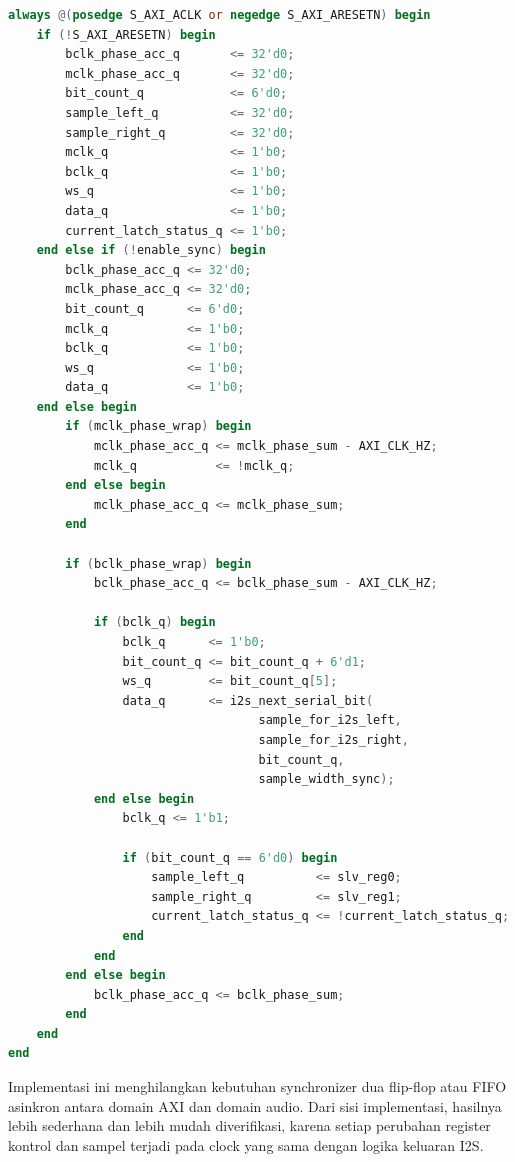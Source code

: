 \begin{lstlisting}[language=Verilog,caption={Core serializer berjalan pada satu domain clock yang sama.},label={lst:ch4-single-clock}]
always @(posedge S_AXI_ACLK or negedge S_AXI_ARESETN) begin
    if (!S_AXI_ARESETN) begin
        bclk_phase_acc_q       <= 32'd0;
        mclk_phase_acc_q       <= 32'd0;
        bit_count_q            <= 6'd0;
        sample_left_q          <= 32'd0;
        sample_right_q         <= 32'd0;
        mclk_q                 <= 1'b0;
        bclk_q                 <= 1'b0;
        ws_q                   <= 1'b0;
        data_q                 <= 1'b0;
        current_latch_status_q <= 1'b0;
    end else if (!enable_sync) begin
        bclk_phase_acc_q <= 32'd0;
        mclk_phase_acc_q <= 32'd0;
        bit_count_q      <= 6'd0;
        mclk_q           <= 1'b0;
        bclk_q           <= 1'b0;
        ws_q             <= 1'b0;
        data_q           <= 1'b0;
    end else begin
        if (mclk_phase_wrap) begin
            mclk_phase_acc_q <= mclk_phase_sum - AXI_CLK_HZ;
            mclk_q           <= !mclk_q;
        end else begin
            mclk_phase_acc_q <= mclk_phase_sum;
        end

        if (bclk_phase_wrap) begin
            bclk_phase_acc_q <= bclk_phase_sum - AXI_CLK_HZ;

            if (bclk_q) begin
                bclk_q      <= 1'b0;
                bit_count_q <= bit_count_q + 6'd1;
                ws_q        <= bit_count_q[5];
                data_q      <= i2s_next_serial_bit(
                                   sample_for_i2s_left,
                                   sample_for_i2s_right,
                                   bit_count_q,
                                   sample_width_sync);
            end else begin
                bclk_q <= 1'b1;

                if (bit_count_q == 6'd0) begin
                    sample_left_q          <= slv_reg0;
                    sample_right_q         <= slv_reg1;
                    current_latch_status_q <= !current_latch_status_q;
                end
            end
        end else begin
            bclk_phase_acc_q <= bclk_phase_sum;
        end
    end
end
\end{lstlisting}

Implementasi ini menghilangkan kebutuhan synchronizer dua flip-flop atau FIFO asinkron antara domain AXI dan domain audio. Dari sisi implementasi, hasilnya lebih sederhana dan lebih mudah diverifikasi, karena setiap perubahan register kontrol dan sampel terjadi pada clock yang sama dengan logika keluaran I2S.

